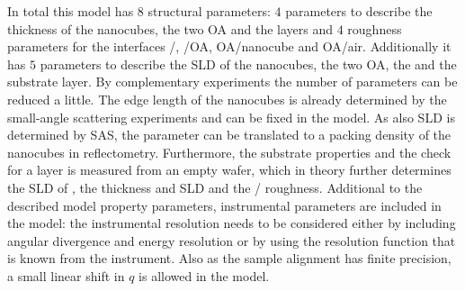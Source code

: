 \documentclass[\main/dresen_thesis.tex]{subfiles}
\begin{document}
    In total this model has $8$ structural parameters: $4$ parameters to describe the thickness of the nanocubes, the two OA and the  layers and $4$ roughness parameters for the interfaces /, /OA, OA/nanocube and OA/air.
    Additionally it has $5$ parameters to describe the SLD of the nanocubes, the two OA, the  and the substrate layer.
    By complementary experiments the number of parameters can be reduced a little.
    The edge length of the nanocubes is already determined by the small-angle scattering experiments and can be fixed in the model.
    As also SLD is determined by SAS, the parameter can be translated to a packing density of the nanocubes in reflectometry.
    Furthermore, the substrate properties and the check for a  layer is measured from an empty wafer, which in theory further determines the SLD of , the  thickness and SLD and the / roughness.
    Additional to the described model property parameters, instrumental parameters are included in the model: the instrumental resolution needs to be considered either by including angular divergence and energy resolution or by using the resolution function that is known from the instrument.
    Also as the sample alignment has finite precision, a small linear shift in $q$ is allowed in the model.
  
\end{document}
